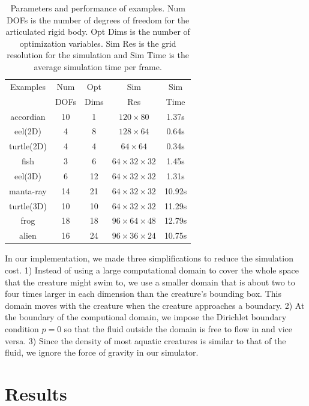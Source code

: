 \begin{table}
\centering
\begin{tabular}{|c|c|c|c|c|}
\hline
Examples & Num & Opt  & Sim  & Sim\\
         & DOFs & Dims & Res & Time \\
 \hline
accordian & 10 & 1 &  $120\times 80$           & 1.37s\\
eel(2D)   & 4  & 8 &  $128 \times 64$         &  0.64s \\
turtle(2D)& 4  & 4 & $64\times 64$           & 0.34s \\
fish      & 3  & 6  & $64\times 32\times 32$  & 1.45s\\
eel(3D)   & 6  & 12 &  $64\times 32\times 32$ & 1.31s\\
manta-ray & 14 & 21 &  $64\times 32\times 32$ & 10.92s\\
turtle(3D)& 10 & 10 &  $64\times 32\times 32$ & 11.29s\\
frog      & 18 & 18 &  $96\times 64\times 48$ & 12.79s\\
alien     & 16 & 24 &  $96\times 36\times 24$ & 10.75s\\

\hline
 \end{tabular}
 \caption{Parameters and performance of examples. Num DOFs is the number of degrees of freedom for the articulated rigid body. Opt Dims is the number of optimization variables. Sim Res is the grid resolution for the simulation and Sim Time is the average simulation time per frame.}
 \label{table:simData}
 \end{table}

In our implementation, we made three simplifications to reduce the
simulation cost. 1) Instead of using a large computational domain to cover
the whole space that the creature might swim to, we use a smaller domain
that is about two to four times larger in each dimension than the
creature's bounding box. This domain moves with the creature when the
creature approaches a boundary. 2) At the boundary of the computional
domain, we impose the Dirichlet boundary condition $p=0$ so that the fluid
outside the domain is free to flow in and vice versa. 3) Since the density
of most aquatic creatures is similar to that of the fluid, we ignore the force of gravity in our simulator.




\section{Results}

